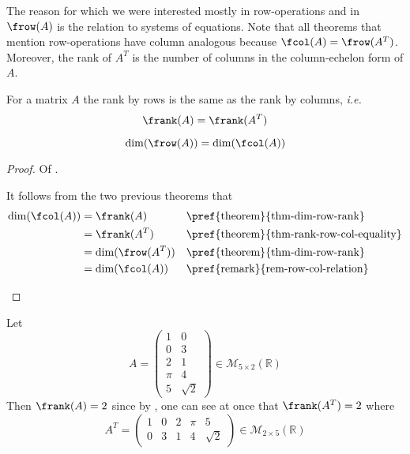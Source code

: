 \begin{rem}\label{rem-row-col-relation}
	The reason for which we were interested mostly in row-operations and in
	$\frow(A)$ is the relation to systems of equations. Note that all theorems
	that mention row-operations have column analogous because $\fcol(A)=\frow(A^T)$.
	Moreover, the rank of $A^T$ is the number of columns in the column-echelon
	form of $A$.
\end{rem}

\begin{thm}\label{thm-rank-row-col-equality}
	For a matrix $A$ the rank by rows is the same as the rank by columns, \textit{i.e.}
	\begin{equation}
		\frank(A)=\frank(A^T)
	\end{equation}
\end{thm}

\begin{crl}\label{crl-dim-row-col}
	\begin{equation}
		\dim(\frow(A))=\dim(\fcol(A))
	\end{equation}
\end{crl}

\begin{proof}
	Of .
	\begin{flushleft}
		It follows from the two previous theorems that
		\begin{align*}
			\dim(\fcol(A)) & =\frank(A)        &  & \text{\pref{theorem}{thm-dim-row-rank}}          \\
			               & =\frank(A^T)      &  & \text{\pref{theorem}{thm-rank-row-col-equality}} \\
			               & =\dim(\frow(A^T)) &  & \text{\pref{theorem}{thm-dim-row-rank}}          \\
			               & =\dim(\fcol(A))   &  & \text{\pref{remark}{rem-row-col-relation}}
		\end{align*}
	\end{flushleft}
\end{proof}

\begin{exm}
	Let
	\begin{equation*}
		A=\begin{pmatrix}
			1   & 0        \\
			0   & 3        \\
			2   & 1        \\
			\pi & 4        \\
			5   & \sqrt{2}
		\end{pmatrix}\in\mathcal{M}_{5\times2}(\mathbb{R})
	\end{equation*}
	Then $\frank(A)=2$ since by ,
	one can see at once that $\frank(A^T)=2$ where
	\begin{equation*}
		A^T=\begin{pmatrix}
			1 & 0 & 2 & \pi & 5        \\
			0 & 3 & 1 & 4   & \sqrt{2}
		\end{pmatrix}\in\mathcal{M}_{2\times5}(\mathbb{R})
	\end{equation*}
\end{exm}


